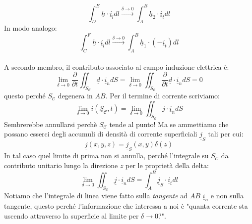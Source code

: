 \documentclass{book}
\begin{document}
        \begin{equation}
            \int_{D} ^{E} \underline{h} \cdot \underline{i}_{l}dl \stackrel{\delta \to 0}{\to} \int_{A} ^{B} \underline{h}_{2} \cdot \underline{i}_{t} dl
        \end{equation}
        In modo analogo:
        \begin{equation}
            \int_{C} ^{F} \underline{h} \cdot \underline{i}_{l}dl \stackrel{\delta \to 0}{\to} \int_{A} ^{B} \underline{h}_{1} \cdot (-\underline{i}_{t}) dl
        \end{equation}
        \\ A secondo membro, il contributo associato al campo induzione elettrica è:
        \begin{equation}
            \lim_{\delta \to 0} \frac{\partial}{ \partial t} \iint_{S_{\mathcal{C}}} \underline{d} \cdot \underline{i}_{n}dS = \lim_{\delta \to 0} \iint_{S_{\mathcal{C}}} \frac{\partial}{\partial t} \underline{d} \cdot \underline{i}_{n} dS = 0
        \end{equation}
        questo perché $S_{\mathcal{C}}$ degenera in $AB$. Per il termine di corrente scriviamo:
        \begin{equation}
            \lim_{\delta \to 0} i(\underline{S}_{\mathcal{C}}, t) = \lim_{\delta \to 0} \iint_{S_{\mathcal{C}}} \underline{j} \cdot \underline{i}_{n}dS
        \end{equation}
        Sembrerebbe annullarsi perchè $S_{\mathcal{C}}$ tende al punto! Ma se ammettiamo che possano esserci degli accumuli di densità di corrente superficiali $\underline{j}_{S}$ tali per cui:
        \begin{equation}
            \underline{j}(x,y,z) = \underline{j}_{S}(x,y) \delta (z)
        \end{equation}
        In tal caso quel limite di prima non si annulla, perché l'integrale su $S_{\mathcal{C}}$ da contributo unitario lungo la direzione $z$ per le proprietà della delta:
        \begin{equation}
            \lim_{\delta \to 0} \iint_{S_{\mathcal{C}}} \underline{j} \cdot \underline{i}_{n}dS = \int_{A} ^{B} \underline{j}_{S} \cdot \underline{i}_{t} dl
        \end{equation}
        Notiamo che l'integrale di linea viene fatto sulla \textit{tangente} ad $AB$ $\underline{i}_{n}$ e non sulla tangente, questo perché l'informazione che interessa a noi è "quanta corrente sta uscendo attraverso la superficie al limite per $\delta \to 0$?". \\
\end{document}
